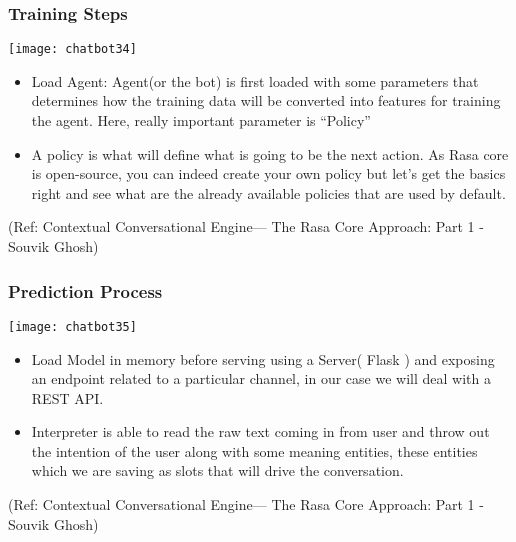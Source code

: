  \begin{frame}[fragile]\frametitle{Training Steps}
 

\begin{center}
\texttt{[image: chatbot34]}

\end{center}

\begin{itemize}
\item Load Agent: Agent(or the bot) is first loaded with some parameters that determines how the training data will be converted into features for training the agent. Here, really important parameter is ``Policy''
\item A policy is what will define what is going to be the next action. As Rasa core is open-source, you can indeed create your own policy but let's get the basics right and see what are the already available policies that are used by default.
\end{itemize}


\tiny{(Ref: Contextual Conversational Engine— The Rasa Core Approach: Part 1 - Souvik Ghosh)}

\end{frame}

 \begin{frame}[fragile]\frametitle{Prediction Process}
 

\begin{center}
\texttt{[image: chatbot35]}

\end{center}

\begin{itemize}
\item Load Model in memory before serving using a Server( Flask ) and exposing an endpoint related to a particular channel, in our case we will deal with a REST API.
\item Interpreter is able to read the raw text coming in from user and throw out the intention of the user along with some meaning entities, these entities which we are saving as slots that will drive the conversation.
\end{itemize}


\tiny{(Ref: Contextual Conversational Engine— The Rasa Core Approach: Part 1 - Souvik Ghosh)}

\end{frame}

